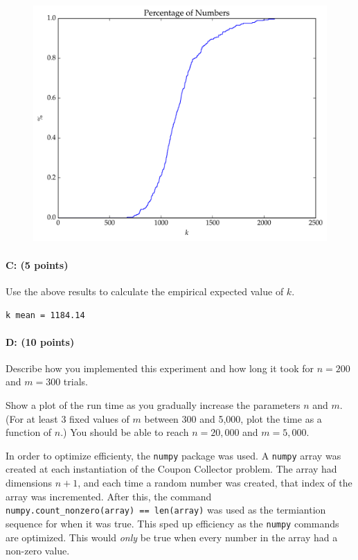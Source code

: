 \documentclass[11pt]{article}
\begin{document}
\begin{figure}[H]
\centering
\includegraphics[width=.75\textwidth]{prob2_percentages.pdf}
\end{figure}

\paragraph{C: (5 points)}
Use the above results to calculate the empirical expected value of $k$.

\verb~k mean = 1184.14~

\paragraph{D: (10 points)} 
Describe how you implemented this experiment and how long it took for $n=200$ and $m=300$ trials.  

Show a plot of the run time as you gradually increase the parameters $n$ and $m$.  
(For at least 3 fixed values of $m$ between 300 and 5,000, plot the time as a function of $n$.)
You should be able to reach $n = 20{,}000$ and $m = 5{,}000$.  

In order to optimize efficienty, the \verb~numpy~ package was used. A \verb~numpy~ array was created at each instantiation of the Coupon Collector problem. The array had dimensions $n + 1$, and each time a random number was created, that index of the array was incremented. After this, the command \\\verb~numpy.count_nonzero(array) == len(array)~ was used as the termiantion sequence for when it was true. This sped up efficiency as the \verb~numpy~ commands are optimized. This would {\em only} be true when every number in the array had a non-zero value.
\end{document}
